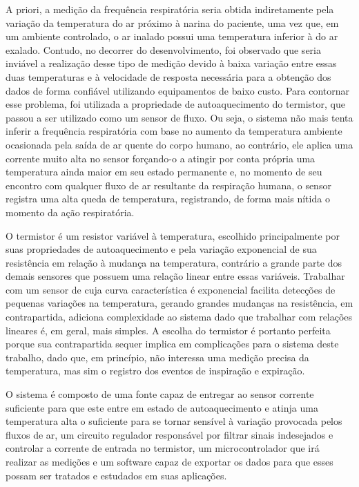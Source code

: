 	A priori, a medição da frequência respiratória seria obtida indiretamente pela variação da temperatura do ar próximo à narina do paciente, uma vez que, em um ambiente controlado, o ar inalado possui uma temperatura inferior à do ar exalado. Contudo, no decorrer do desenvolvimento, foi observado que seria inviável a realização desse tipo de medição devido à baixa variação entre essas duas temperaturas e à velocidade de resposta necessária para a obtenção dos dados de forma confiável utilizando equipamentos de baixo custo. Para contornar esse problema, foi utilizada a propriedade de autoaquecimento do termistor, que passou a ser utilizado como um sensor de fluxo. Ou seja, o sistema não mais tenta inferir a frequência respiratória com base no aumento da temperatura ambiente ocasionada pela saída de ar quente do corpo humano, ao contrário, ele aplica uma corrente muito alta no sensor forçando-o a atingir por conta própria uma temperatura ainda maior em seu estado permanente e, no momento de seu encontro com qualquer fluxo de ar resultante da respiração humana, o sensor registra uma alta queda de temperatura, registrando, de forma mais nítida o momento da ação respiratória.

	O termistor é um resistor variável à temperatura, escolhido principalmente por suas propriedades de autoaquecimento e pela variação exponencial de sua resistência em relação à mudança na temperatura, contrário a grande parte dos demais sensores que possuem uma relação linear entre essas variáveis. Trabalhar com um sensor de cuja curva característica é exponencial facilita detecções de pequenas variações na temperatura, gerando grandes mudanças na resistência, em contrapartida, adiciona complexidade ao sistema dado que trabalhar com relações lineares é, em geral, mais simples. A escolha do termistor é portanto perfeita porque sua contrapartida sequer implica em complicações para o sistema deste trabalho, dado que, em princípio, não interessa uma medição precisa da temperatura, mas sim o registro dos eventos de inspiração e expiração.
	
	O sistema é composto de uma fonte capaz de entregar ao sensor corrente suficiente para que este entre em estado de autoaquecimento e atinja uma temperatura alta o suficiente para se tornar sensível à variação provocada pelos fluxos de ar, um circuito regulador responsável por filtrar sinais indesejados e controlar a corrente de entrada no termistor, um microcontrolador que irá realizar as medições e um software capaz de exportar os dados para que esses possam ser tratados e estudados em suas aplicações.  

